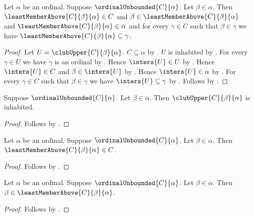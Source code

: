 \begin{proposition}\label{least_member_above_properties}
    Let $\alpha$ be an ordinal.
    Suppose $\ordinalUnbounded{C}{\alpha}$.
    Let $\beta\in\alpha$.
    Then $\leastMemberAbove{C}{\beta}{\alpha}\in C$ and
        $\beta\in\leastMemberAbove{C}{\beta}{\alpha}$ and
        $\leastMemberAbove{C}{\beta}{\alpha}\in\alpha$ and
        for every $\gamma\in C$ such that $\beta\in\gamma$ we have
            $\leastMemberAbove{C}{\beta}{\alpha}\subseteq\gamma$.
\end{proposition}
\begin{proof}
    Let $U=\clubUpper{C}{\beta}{\alpha}$.
    $C\subseteq\alpha$ by .
    $U$ is inhabited by .
    For every $\gamma\in U$ we have $\gamma$ is an ordinal
        by .
    Hence $\inters{U}\in U$ by .
    Hence $\inters{U}\in C$ and $\beta\in\inters{U}$
        by .
    Hence $\inters{U}\in\alpha$ by .
    For every $\gamma\in C$ such that $\beta\in\gamma$ we have
        $\inters{U}\subseteq\gamma$
        by .
    Follows by .
\end{proof}

\begin{proposition}\label{least_member_above_candidates_inhabited}
    Suppose $\ordinalUnbounded{C}{\alpha}$.
    Let $\beta\in\alpha$.
    Then $\clubUpper{C}{\beta}{\alpha}$ is inhabited.
\end{proposition}
\begin{proof}
    Follows by .
\end{proof}

\begin{proposition}\label{least_member_above_mem}
    Let $\alpha$ be an ordinal.
    Suppose $\ordinalUnbounded{C}{\alpha}$.
    Let $\beta\in\alpha$.
    Then $\leastMemberAbove{C}{\beta}{\alpha}\in C$.
\end{proposition}
\begin{proof}
    Follows by .
\end{proof}

\begin{proposition}\label{least_member_above_strict}
    Let $\alpha$ be an ordinal.
    Suppose $\ordinalUnbounded{C}{\alpha}$.
    Let $\beta\in\alpha$.
    Then $\beta\in\leastMemberAbove{C}{\beta}{\alpha}$.
\end{proposition}
\begin{proof}
    Follows by .
\end{proof}

